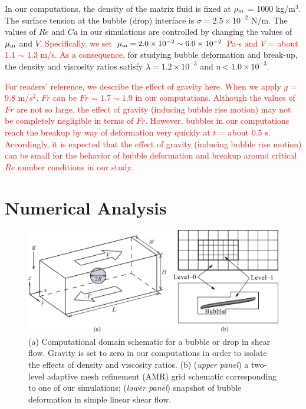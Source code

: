 \documentclass{elsarticle}
\begin{document}
\par
In our computations, the density of the matrix fluid is fixed at $\rho_{\rm m}$ = 1000 kg/m$^3$.  The surface tension at the bubble (drop) interface is $\sigma =2.5 \times 10^{-2}$ N/m. The values of $Re$ and $Ca$ in our simulations are controlled by changing the values of $\mu_{\rm m}$ and $V$.  
\textcolor{red}
{
Specifically, we set $\mu_{\rm m} = 2.0 \times 10^{-2} \sim 6.0 \times 10^{-2}$ Pa$\cdot$s and
$V$ = about 1.1 $\sim$ 1.3 m/s.
As a consequence, 
}
for studying bubble deformation and break-up, the density and viscosity ratios satisfy
$\lambda = 1.2 \times 10^{-3}$ and $\eta < 1.0 \times 10^{-3}$.
\par
\textcolor{red}
{
For readers’ reference, we describe the effect of gravity here. When we apply $g$ = 9.8 m/$s^{2}$,  $Fr$  can be $Fr$ = $1.7 \sim 1.9$ in our computations.  Although the values of $Fr$ are not so large, the effect of gravity (inducing bubble rise motion) may not be completely negligible in terms of $Fr$.  However, bubbles in our computations reach the breakup by way of deformation very quickly at $t$ = about 0.5 s.  Accordingly, it is expected that the effect of gravity (inducing bubble rise motion) can be small for the behavior of bubble deformation and breakup around critical $Re$ number conditions in our study.  }
\section{Numerical Analysis}
% 
\begin{figure}%
  \centering
  \includegraphics[scale=0.4]{Figure/1-SchematicAndGrid}
  \caption{(a) Computational domain schematic for a bubble or drop in shear 
           flow.  Gravity is set to zero in our computations in order to isolate
           the effects of density and viscosity ratios.  
           (b) (\textit{upper panel}) a two-level adaptive mesh 
           refinement (AMR) grid schematic corresponding to one of our
           simulations;
           (\textit{lower panel}) snapshot of bubble deformation 
           in simple linear shear flow.}
  \label{fig:SchemAndGrid}
\end{figure}
%
\end{document}
